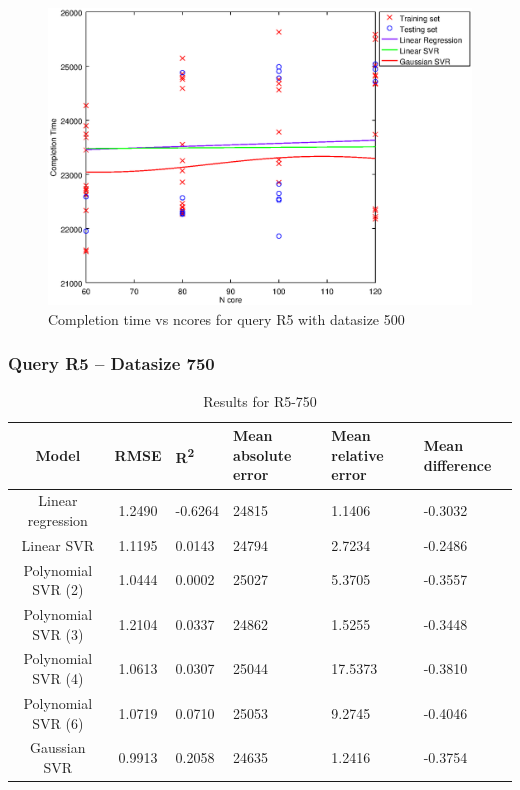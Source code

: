 \documentclass[a4paper,11pt]{article}
\begin{document}
\begin {figure}[hbtp]
\centering
\includegraphics[width=\textwidth]{output/R5_500_LINEAR_NCORE/plot_R5_500_bestmodels.eps}
\caption{Completion time vs ncores for query R5 with datasize 500}
\label{fig:all_linear_R5_500}
\end {figure}

\newpage
\subsubsection{Query R5 -- Datasize 750}
\begin{table}[H]
	\centering
	\begin{adjustbox}{center}
		\begin{tabular}{c | c M{1.2cm} M{2.5cm} M{2.5cm} M{1.8cm}}
			Model & RMSE & R\textsuperscript{2} & Mean absolute error & Mean relative error & Mean difference \tabularnewline
			\hline
			Linear regression & 1.2490 & -0.6264 &  24815 & 1.1406 & -0.3032 \\
			Linear SVR & 1.1195 & 0.0143 &  24794 & 2.7234 & -0.2486 \\
			Polynomial SVR (2) & 1.0444 & 0.0002 &  25027 & 5.3705 & -0.3557 \\
			Polynomial SVR (3) & 1.2104 & 0.0337 &  24862 & 1.5255 & -0.3448 \\
			Polynomial SVR (4) & 1.0613 & 0.0307 &  25044 & 17.5373 & -0.3810 \\
			Polynomial SVR (6) & 1.0719 & 0.0710 &  25053 & 9.2745 & -0.4046 \\
			Gaussian SVR & 0.9913 & 0.2058 &  24635 & 1.2416 & -0.3754 \\
		\end{tabular}
	\end{adjustbox}
	\\
	\caption{Results for R5-750}
	\label{fig:all_linear_R5_750}
\end{table}
\end{document}
